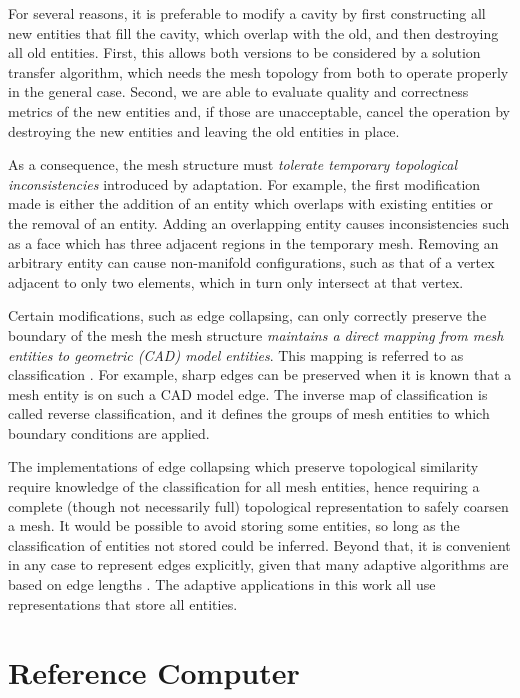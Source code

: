 For several reasons, it is preferable to modify a cavity
by first constructing all new entities that fill the cavity,
which overlap with the old, and then destroying all old entities.
First, this allows both versions to be considered by a solution
transfer algorithm, which needs the mesh topology from both
to operate properly in the general case.
Second, we are able to evaluate quality and correctness metrics
of the new entities and, if those are unacceptable, cancel the
operation by destroying the new entities and leaving
the old entities in place.

As a consequence, the mesh structure must \emph{tolerate temporary
topological inconsistencies} introduced by adaptation.
For example, the first modification made is either the addition
of an entity which overlaps with existing entities
or the removal of an entity.
Adding an overlapping entity causes inconsistencies such as
a face which has three adjacent regions in the temporary mesh.
Removing an arbitrary entity can cause non-manifold configurations,
such as that of a vertex adjacent to only two elements, which
in turn only intersect at that vertex.

Certain modifications, such as edge collapsing, can only correctly
preserve the boundary of the mesh the mesh structure \emph{maintains
a direct mapping from mesh entities to geometric (CAD) model
entities}.
This mapping is referred to as classification \cite{schroeder1990combined}.
For example, sharp edges
can be preserved when it is known that a mesh entity is
on such a CAD model edge.
The inverse map of classification is called reverse
classification, and it defines the groups of mesh entities
to which boundary conditions are applied.

The implementations of edge collapsing which preserve
topological similarity require knowledge
of the classification for all mesh entities,
hence requiring a complete (though not necessarily full)
topological representation \cite{seol2006efficient}
to safely coarsen a mesh.
It would be possible to avoid storing some entities, so long
as the classification of entities not stored could be inferred.
Beyond that, it is convenient in any case to represent
edges explicitly, given that many adaptive algorithms
are based on edge lengths \cite{biswas1998tetrahedral}.
The adaptive applications in this work all use representations
that store all entities.

\section{Reference Computer}
\label{sec:ref_comp}

